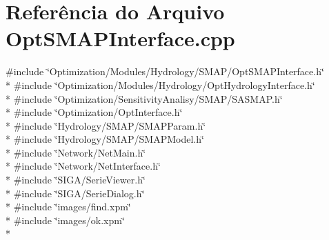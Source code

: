 \section{Referência do Arquivo Opt\+S\+M\+A\+P\+Interface.\+cpp}
\label{_opt_s_m_a_p_interface_8cpp}
{\ttfamily \#include \char`\"{}Optimization/\+Modules/\+Hydrology/\+S\+M\+A\+P/\+Opt\+S\+M\+A\+P\+Interface.\+h\char`\"{}}\\*
{\ttfamily \#include \char`\"{}Optimization/\+Modules/\+Hydrology/\+Opt\+Hydrology\+Interface.\+h\char`\"{}}\\*
{\ttfamily \#include \char`\"{}Optimization/\+Sensitivity\+Analisy/\+S\+M\+A\+P/\+S\+A\+S\+M\+A\+P.\+h\char`\"{}}\\*
{\ttfamily \#include \char`\"{}Optimization/\+Opt\+Interface.\+h\char`\"{}}\\*
{\ttfamily \#include \char`\"{}Hydrology/\+S\+M\+A\+P/\+S\+M\+A\+P\+Param.\+h\char`\"{}}\\*
{\ttfamily \#include \char`\"{}Hydrology/\+S\+M\+A\+P/\+S\+M\+A\+P\+Model.\+h\char`\"{}}\\*
{\ttfamily \#include \char`\"{}Network/\+Net\+Main.\+h\char`\"{}}\\*
{\ttfamily \#include \char`\"{}Network/\+Net\+Interface.\+h\char`\"{}}\\*
{\ttfamily \#include \char`\"{}S\+I\+G\+A/\+Serie\+Viewer.\+h\char`\"{}}\\*
{\ttfamily \#include \char`\"{}S\+I\+G\+A/\+Serie\+Dialog.\+h\char`\"{}}\\*
{\ttfamily \#include \char`\"{}images/find.\+xpm\char`\"{}}\\*
{\ttfamily \#include \char`\"{}images/ok.\+xpm\char`\"{}}\\*
